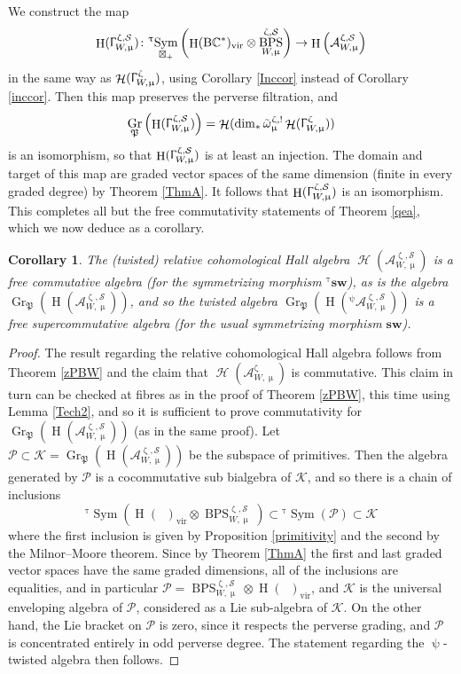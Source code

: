 \documentclass[a4paper,10pt]{amsart}
\renewcommand{\zeta}{\upzeta}
\renewcommand{\Gamma}{\Upgamma}
\renewcommand{\psi}{\uppsi}
\renewcommand{\tau}{\uptau}
\renewcommand{\mu}{\upmu}
\newtheorem{corollary}[theorem]{Corollary}
\DeclareMathOperator{\BC}{B\mathbb{C}^*}
\DeclareMathOperator{\Pf}{\mathfrak{P}}
\newcommand{\SP}{\mathcal{S}}
\DeclareMathOperator{\Gr}{Gr}
\DeclareMathOperator{\DT}{BPS}
\DeclareMathOperator{\Sym}{Sym}
\DeclareMathOperator{\vir}{vir}
\DeclareMathOperator{\Ho}{\mathcal{H}}
\DeclareMathOperator{\HO}{H}
\begin{document}
We construct the map
\[
\HO(\Gamma_{W,\mu}^{\zeta,\SP})\colon {}^{\tau}\!\Sym_{\boxtimes_+}\left(\HO(\BC )_{\vir}\otimes\DT^{\zeta,\SP}_{W,\mu}\right)\rightarrow\HO\left(\mathcal{A}^{\zeta,\SP}_{W,\mu}\right)
\]
in the same way as $\Ho(\Gamma_{W,\mu}^{\zeta})$, using Corollary \ref{Inccor} instead of Corollary \ref{inccor}.  Then this map preserves the perverse filtration, and
\[
\Gr_{\Pf}\left(\HO(\Gamma_{W,\mu}^{\zeta,\SP})\right)=\Ho(\dim_*\tilde{\omega}^{\zeta,!}_{\mu}\Ho(\Gamma_{W,\mu}^{\zeta}))
\]
is an isomorphism, so that $\HO(\Gamma_{W,\mu}^{\zeta,\SP})$ is at least an injection.  The domain and target of this map are graded vector spaces of the same dimension (finite in every graded degree) by Theorem \ref{ThmA}.  It follows that $\HO(\Gamma_{W,\mu}^{\zeta,\SP})$ is an isomorphism.  This completes all but the free commutativity statements of Theorem \ref{qea}, which we now deduce as a corollary.
\begin{corollary}
\label{twSC}
The (twisted) relative cohomological Hall algebra $\Ho(\mathcal{A}^{\zeta,\SP}_{W,\mu})$ is a free commutative algebra (for the symmetrizing morphism ${}^{\tau}\!\textbf{sw}$), as is the algebra $\Gr_{\Pf}\left(\HO(\mathcal{A}^{\zeta,\SP}_{W,\mu})\right)$, and so the twisted algebra $\Gr_{\Pf}\left(\HO(^{\psi}\!\mathcal{A}^{\zeta,\SP}_{W,\mu})\right)$ is a free supercommutative algebra (for the usual symmetrizing morphism $\textbf{sw}$).
\end{corollary}
\begin{proof}
The result regarding the relative cohomological Hall algebra follows from Theorem \ref{zPBW} and the claim that $\Ho(\mathcal{A}^{\zeta}_{W,\mu})$ is commutative.  This claim in turn can be checked at fibres as in the proof of Theorem \ref{zPBW}, this time using Lemma \ref{Tech2}, and so it is sufficient to prove commutativity for $\Gr_{\Pf}\left(\HO(\mathcal{A}^{\zeta,\SP}_{W,\mu})\right)$ (as in the same proof).  Let $\mathcal{P}\subset \mathcal{K}=\Gr_{\Pf}\left(\HO(\mathcal{A}^{\zeta,\SP}_{W,\mu})\right)$ be the subspace of primitives.  Then the algebra generated by $\mathcal{P}$ is a cocommutative sub bialgebra of $\mathcal{K}$, and so there is a chain of inclusions 
\[
{}^{\tau}\!\Sym\left(\HO(\BC)_{\vir}\otimes \DT^{\zeta,\SP}_{W,\mu}\right)\subset {}^{\tau}\!\Sym(\mathcal{P})\subset \mathcal{K}
\]
where the first inclusion is given by Proposition \ref{primitivity} and the second by the Milnor--Moore theorem.  Since by Theorem \ref{ThmA} the first and last graded vector spaces have the same graded dimensions, all of the inclusions are equalities, and in particular $\mathcal{P}=\DT^{\zeta,\SP}_{W,\mu}\otimes\HO(\BC)_{\vir}$, and $\mathcal{K}$ is the universal enveloping algebra of $\mathcal{P}$, considered as a Lie sub-algebra of $\mathcal{K}$.  On the other hand, the Lie bracket on $\mathcal{P}$ is zero, since it respects the perverse grading, and $\mathcal{P}$ is concentrated entirely in odd perverse degree.  The statement regarding the $\psi$-twisted algebra then follows.
\end{proof}
\end{document}
